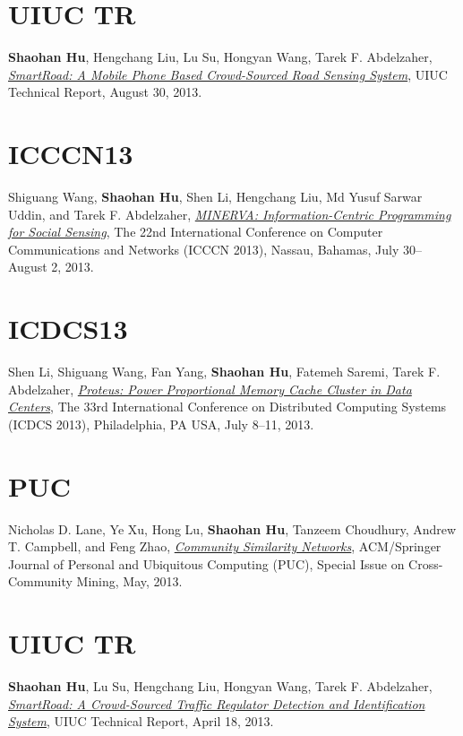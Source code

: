 \section{\sc UIUC TR}\hypertarget{hu2013uiuc2}{}
\textbf{Shaohan Hu}, Hengchang Liu, Lu Su, Hongyan Wang, Tarek F.
Abdelzaher, \href{https://www.ideals.illinois.edu/handle/2142/45699}{\emph{SmartRoad: A Mobile Phone Based Crowd-Sourced Road
  Sensing System}}, \textsf{UIUC Technical Report}, August 30, 2013.

\section{\sc ICCCN13}\hypertarget{wang2013icccn}{}
Shiguang Wang, \textbf{Shaohan Hu}, Shen Li, Hengchang Liu, Md Yusuf
Sarwar Uddin, and Tarek F. Abdelzaher, \href{http://ieeexplore.ieee.org/xpls/abs_all.jsp?arnumber=6614152}{\emph{MINERVA: Information-Centric
  Programming for Social Sensing}}, \textsf{The 22nd International
  Conference on Computer Communications and Networks (ICCCN 2013)},
Nassau, Bahamas, July 30--August 2, 2013.

\section{\sc ICDCS13}\hypertarget{li2013icdcs}{}
Shen Li, Shiguang Wang, Fan Yang, \textbf{Shaohan Hu}, Fatemeh Saremi,
Tarek F. Abdelzaher, \href{http://ieeexplore.ieee.org/xpl/articleDetails.jsp?arnumber=6681577}{\emph{Proteus: Power Proportional Memory Cache
  Cluster in Data Centers}}, \textsf{The 33rd International Conference
  on Distributed Computing Systems (ICDCS 2013)}, Philadelphia, PA USA,
July 8--11, 2013.

\section{\sc PUC}\hypertarget{lane2013puc}{}
Nicholas D. Lane, Ye Xu, Hong Lu, \textbf{Shaohan Hu}, Tanzeem
Choudhury, Andrew T. Campbell, and Feng Zhao, \href{http://link.springer.com/article/10.1007/s00779-013-0655-1}{\emph{Community Similarity Networks}}, \textsf{ACM/Springer Journal of Personal
  and Ubiquitous Computing (PUC), Special Issue on Cross-Community
  Mining}, May, 2013.

\section{\sc UIUC TR}\hypertarget{hu2013uiuc1}{}
\textbf{Shaohan Hu}, Lu Su, Hengchang Liu, Hongyan Wang, Tarek F.
Abdelzaher, \href{https://www.ideals.illinois.edu/handle/2142/43856}{\emph{SmartRoad: A Crowd-Sourced Traffic Regulator
  Detection and Identification System}}, \textsf{UIUC Technical
  Report}, April 18, 2013.

